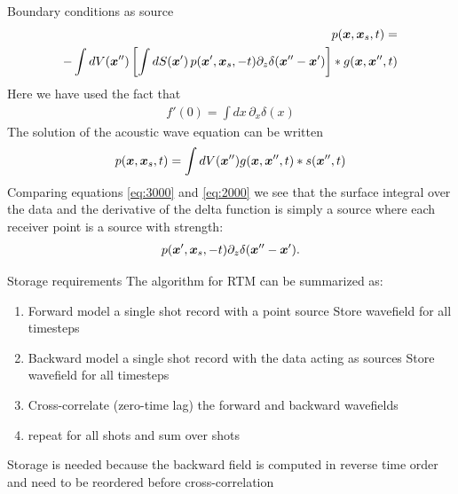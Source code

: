 \documentclass[xcolor=dvipsnames,notes]{beamer}
\begin{document}
\begin{frame}{Boundary conditions as source}
\begin{eqnarray}
p(\mbox{\boldmath $x$},\mbox{\boldmath $x$}_s,t)  = \nonumber\\
 - \int dV(\mbox{\boldmath $x$}'')\left[\int dS(\mbox{\boldmath $x$}')\, p(\mbox{\boldmath $x$}',\mbox{\boldmath $x$}_s,-t)\partial_z \delta(\mbox{\boldmath $x$}''-\mbox{\boldmath $x$}')\right]*g(\mbox{\boldmath $x$},\mbox{\boldmath $x$}'',t)
                  \label{eq:2000}
\end{eqnarray}
%
Here we have used the fact that
\begin{eqnarray}
f'(0) = \int dx\, \partial_x \delta(x)
\end{eqnarray}
The solution of the acoustic wave equation can be written
\begin{eqnarray}
p(\mbox{\boldmath $x$},\mbox{\boldmath $x$}_s,t) = \int dV(\mbox{\boldmath $x$}'') g(\mbox{\boldmath $x$},\mbox{\boldmath $x$}'',t)* s(\mbox{\boldmath $x$}'',t)
                              \label{eq:3000}
\end{eqnarray}
Comparing equations \eqref{eq:3000} and \eqref{eq:2000} we see that the surface integral over 
the data and the derivative of the delta function is simply a source where each receiver point is
a source with strength:
\begin{eqnarray}
    p(\mbox{\boldmath $x$}',\mbox{\boldmath $x$}_s,-t)\partial_z \delta(\mbox{\boldmath $x$}''-\mbox{\boldmath $x$}').
\end{eqnarray}
\end{frame}
\begin{frame}{Storage requirements}
The algorithm for RTM can be summarized as:
\begin{enumerate}
  \item Forward model a single shot record with a point source
        Store wavefield for all timesteps
  \item Backward model a single shot record with the data acting as sources
        Store wavefield for all timesteps
  \item Cross-correlate (zero-time lag) the forward and backward wavefields
  \item repeat for all shots and sum over shots
\end{enumerate}
Storage is needed because the backward field is computed
in reverse time order and need to be reordered before cross-correlation
\end{frame}
\end{document}
